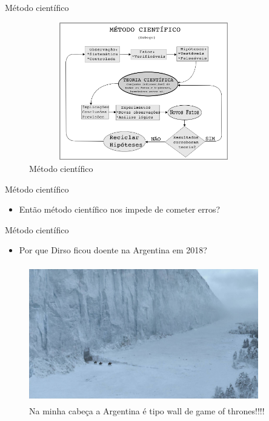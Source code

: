 \begin{frame}	
	\begin{block}{Método científico}	
			\begin{figure}[!htb]
				\centering	  				
					\includegraphics[height=6cm, width = 10cm]{./pic/metodoCientifico.png}
				\caption{Método científico}
				\label{fig_brincadeira}
		\end{figure}	
	\end{block}
\end{frame}

\begin{frame}	
	\begin{block}{Método científico}	
			\begin{itemize}
				\item Então método científico nos impede de cometer erros?
			\end{itemize}
	\end{block}
\end{frame}

\begin{frame}	
	\begin{block}{Método científico}	
			\begin{itemize}
				\item Por que Dirso ficou doente na Argentina em 2018?
			\end{itemize}
			\begin{figure}[!htb]
				\centering	  				
					\includegraphics[height=6cm, width = 10cm]{./pic/wall.jpg}
				\caption{Na minha cabeça a Argentina é tipo wall de game of thrones!!!!}
				\label{fig_brincadeira}
		\end{figure}	
	\end{block}
\end{frame}

